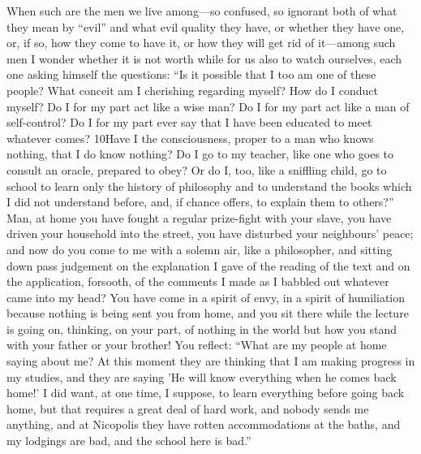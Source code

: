 When such are the men we live among—so confused, so ignorant both of what they mean by ``evil'' and what evil quality they have, or whether they have one, or, if so, how they come to have it, or how they will get rid of it—among such men I wonder whether it is not worth while for us also to watch ourselves, each one asking himself the questions: ``Is it possible that I too am one of these people? What conceit am I cherishing regarding myself? How do I conduct myself? Do I for my part act like a wise man? Do I for my part act like a man of self-control? Do I for my part ever say that I have been educated to meet whatever comes? 10Have I the consciousness, proper to a man who knows nothing, that I do know nothing? Do I go to my teacher, like one who goes to consult an oracle, prepared to obey? Or do I, too, like a sniffling child, go to school to learn only the history of philosophy and to understand the books which I did not understand before, and, if chance offers, to explain them to others?'' Man, at home you have fought a regular prize-fight with your slave, you have driven your household into the street, you have disturbed your neighbours' peace; and now do you come to me with a solemn air, like a philosopher, and sitting down pass judgement on the explanation I gave of the reading of the text and on the application, forsooth, of the comments I made as I babbled out whatever came into my head? You have come in a spirit of envy, in a spirit of humiliation because nothing is being sent you from home, and you sit there while the lecture is going on, thinking, on your part, of nothing in the world but how you stand with your father or your brother! You reflect: ``What are my people at home saying about me? At this moment they are thinking that I am making progress in my studies, and they are saying 'He will know everything when he comes back home!' I did want, at one time, I suppose, to learn everything before going back home, but that requires a great deal of hard work, and nobody sends me anything, and at Nicopolis they have rotten accommodations at the baths, and my lodgings are bad, and the school here is bad.''

